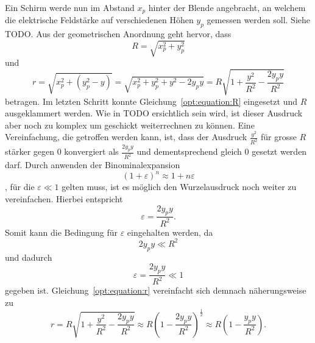 Ein Schirm werde nun im Abstand $x_p$ hinter der Blende angebracht, an welchem die elektrische Feldstärke auf verschiedenen Höhen $y_p$ gemessen werden soll.
Siehe TODO. Aus der geometrischen Anordnung geht hervor, dass
\begin{equation}
R
=
\sqrt{x_p^2 + y_p^2}
\label{opt:equation:R}
\end{equation}
und
\begin{equation}
r
=
\sqrt{x_p^2 + (y_p^2-y)}
=
\sqrt{x_p^2 + y_p^2 + y^2 - 2y_py}
=
R \sqrt{1 + \frac{y^2}{R^2} - \frac{2y_py}{R^2}}
\label{opt:equation:r}
\end{equation}
betragen.
Im letzten Schritt konnte Gleichung~\ref{opt:equation:R} eingesetzt und $R$ ausgeklammert werden.
Wie in TODO ersichtlich sein wird, ist dieser Ausdruck aber noch zu komplex um geschickt weiterrechnen zu können.
Eine Vereinfachung, die getroffen werden kann, ist, dass der Ausdruck $\frac{y^2}{R^2}$ für grosse $R$ stärker gegen 0 konvergiert als $\frac{2y_py}{R^2}$ und dementsprechend gleich 0 gesetzt werden darf.
Durch anwenden der Binominalexpansion
\begin{equation}
(1 + \varepsilon)^n
\approx
1 + n\varepsilon
\end{equation}
, für die $\varepsilon \ll 1$ gelten muss, ist es möglich den Wurzelausdruck noch weiter zu vereinfachen.
Hierbei entspricht
\begin{equation}
\varepsilon
=
\frac{2y_py}{R^2}
.
\end{equation}
Somit kann die Bedingung für $\varepsilon$ eingehalten werden, da
\begin{equation}
2y_py
\ll
R^2
\end{equation}
und dadurch
\begin{equation}
\varepsilon
=
\frac{2y_py}{R^2}
\ll
1
\end{equation}
gegeben ist.
Gleichung~\ref{opt:equation:r} vereinfacht sich demnach näherungsweise zu
\begin{equation}
r
=
R \sqrt{1 + \frac{y^2}{R^2} - \frac{2y_py}{R^2}}
\approx
R \left(1 - \frac{2y_py}{R^2}\right)^\frac{1}{2}
\approx
R \left(1 - \frac{y_py}{R^2}\right)
.
\end{equation}

